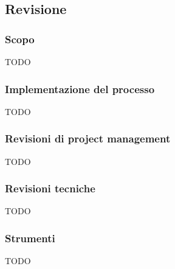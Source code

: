 \subsection{Revisione}\label{revisione}

\subsubsection{Scopo}
\par TODO

\subsubsection{Implementazione del processo}
\par TODO

\subsubsection{Revisioni di project management}
\par TODO

\subsubsection{Revisioni tecniche}
\par TODO

\subsubsection{Strumenti}
\par TODO